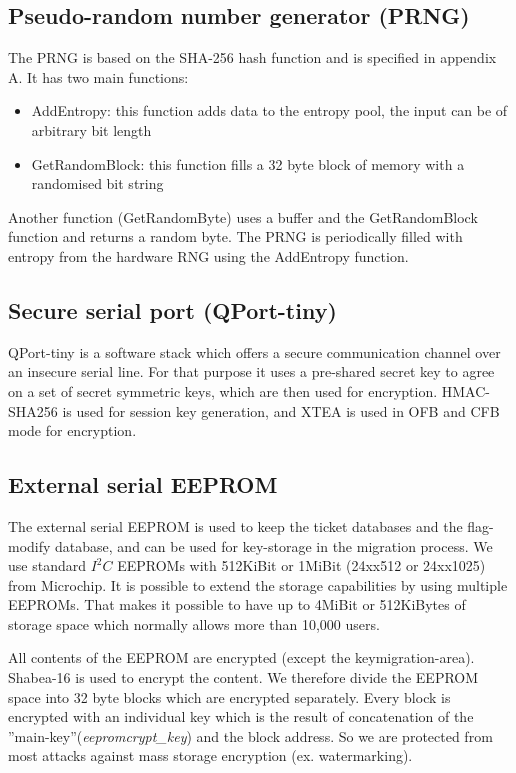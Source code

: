 \subsection{Pseudo-random number generator (PRNG)}
The PRNG is based on the SHA-256 hash function and is specified in appendix A.
It has two main functions:
\begin{itemize}
 \item AddEntropy: this function adds data to the entropy pool, the input can be of arbitrary bit length
 \item GetRandomBlock: this function fills a 32 byte block of memory with a randomised bit string
\end{itemize}
Another function (GetRandomByte) uses a buffer and the GetRandomBlock function and returns a random byte.
The PRNG is periodically filled with entropy from the hardware RNG using the AddEntropy function.


\subsection{Secure serial port (QPort-tiny)}
QPort-tiny\cite{QPort-tiny} is a software stack which offers a secure communication channel over an insecure serial line. For that purpose it uses a pre-shared secret key to agree on a set of secret symmetric keys, which are then used for encryption. HMAC-SHA256 is used for session key generation, and XTEA\cite{XTEA} is used in OFB and CFB mode for encryption. 

\subsection{External serial EEPROM}
The external serial EEPROM is used to keep the ticket databases and the flag-modify database, and can be used for key-storage in the migration process. We use standard $I^2C$\cite{I2C} EEPROMs with 512KiBit or 1MiBit (24xx512\cite{24xx512} or 24xx1025\cite{24xx1025}) from Microchip\cite{microchip}. It is possible to extend the storage capabilities by using multiple EEPROMs. That makes it possible to have up to 4MiBit or 512KiBytes of storage space which normally allows more than 10,000 users.

All contents of the EEPROM are encrypted (except the keymigration-area). Shabea-16 is used to encrypt the content. We therefore divide the EEPROM space into 32 byte blocks which are encrypted separately. Every block is encrypted with an individual key which is the result of concatenation of the ''main-key''(\textit{eepromcrypt\_key}) and the block address. So we are protected from most attacks against mass storage encryption (ex. watermarking).

